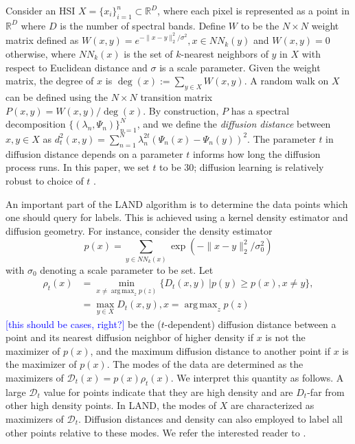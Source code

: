 \documentclass{article}
\def\R{{\mathbb R}}
\newcommand{\Dt}{\mathcal{D}_{t}}
\DeclareMathOperator*{\argmax}{arg\,max}
\newcommand{\JMM}[1]{{\textcolor{blue}{[#1]}}}
\begin{document}
Consider an HSI $X=\{x_{i}\}_{i=1}^{n}\subset\mathbb{R}^{D}$, where each pixel is represented as a point in $\R^{D}$ where $D$ is the number of spectral bands. Define $W$ to be the $N\times N$ weight matrix defined as $W(x,y)= e^{-\|x-y\|_{2}^{2}/\sigma^{2}}, x\in NN_{k}(y)$ and $W(x,y)=0$ otherwise, where $NN_{k}(x)$ is the set of $k$-nearest neighbors of $y$ in $X$ with respect to Euclidean distance and $\sigma$ is a scale parameter. Given the weight matrix, the degree of $x$ is $\deg(x):=\sum_{y\in X}W(x,y)$. A random walk on $X$ can be defined using the $N\times N$ transition matrix $P(x,y)={W(x,y)}\big/{\deg(x)}.$  
By construction, $P$ has a spectral decomposition $\{(\lambda_{n},\Psi_{n})\}_{n=1}^{N}$, and we define the \emph{diffusion distance} between $x,y\in X$ as $d_{t}^2(x,y)={\sum\nolimits_{n=1}^{N}\lambda_{n}^{2t}(\Psi_{n}(x)-\Psi_{n}(y))^{2}}$.  The parameter $t$ in diffusion distance depends on a parameter $t$ informs how long the diffusion process runs.  In this paper, we set $t$ to be 30; diffusion learning is relatively robust to choice of $t$ \cite{Murphy2019_Unsupervised}. 

An important part of the LAND algorithm is to determine the data points which one should query for labels. This is achieved using a kernel density estimator and diffusion geometry. For instance, consider the density estimator 
\[
p(x)=\sum_{y\in NN_{k}(x)}\exp(-\|x-y\|_{2}^{2}/\sigma_{0}^{2})
\]
with $\sigma_0$ denoting a scale parameter to be set. Let \begin{align}\label{eqn:rho}\rho_{t}(x) &=
\underset{x\neq \argmax_{z}p(z)}{\min} \{D_{t}(x,y) \ | p(y)\ge p(x), x\neq y\}, \nonumber \\
& = \max_{y\in X} D_{t}(x,y),x=\argmax_{z}p(z)
\end{align} \JMM{this should be cases, right?} be the ($t$-dependent) diffusion distance between a point and its nearest diffusion neighbor of higher density if $x$ is not the maximizer of $p(x)$, and the maximum diffusion distance to another point if $x$ is the maximizer of $p(x)$.  The modes of the data are determined as the maximizers of $\Dt(x)=p(x)\rho_{t}(x)$.  We interpret this quantity as follows. A large $\Dt$ value for points indicate that they are high density and are $D_{t}$-far from other high density points. In LAND, the modes of $X$ are characterized as maximizers of $\Dt$. Diffusion distances and density can also employed to label all other points relative to these modes. We refer the interested reader to 
\cite{Maggioni2019_LAND}. 
\end{document}
